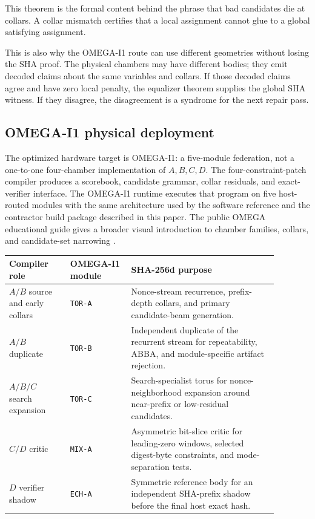\documentclass[11pt]{article}
\theoremstyle{definition}
\theoremstyle{remark}
\begin{document}
This theorem is the formal content behind the phrase that bad candidates die at
collars. A collar mismatch certifies that a local assignment cannot glue to a
global satisfying assignment.

This is also why the OMEGA-I1 route can use different geometries without losing
the SHA proof. The physical chambers may have different bodies; they emit
decoded claims about the same variables and collars. If those decoded claims
agree and have zero local penalty, the equalizer theorem supplies the global SHA
witness. If they disagree, the disagreement is a syndrome for the next repair
pass.

\subsection{OMEGA-I1 physical deployment}

The optimized hardware target is OMEGA-I1: a five-module federation, not
a one-to-one four-chamber implementation of \(A,B,C,D\). The four-constraint-patch compiler
produces a scorebook, candidate grammar, collar residuals, and exact-verifier
interface. The OMEGA-I1 runtime executes that program on five host-routed
modules with the
same architecture used by the software reference and the contractor build package
described in this paper.
The public OMEGA educational guide gives a broader visual introduction to
chamber families, collars, and candidate-set narrowing \cite{OmegaEducationalGuide2026}.

\begin{center}
\begin{minipage}{\linewidth}
\centering
\small
\begin{tabular}{L{0.20\linewidth}L{0.20\linewidth}L{0.48\linewidth}}
\toprule
Compiler role & OMEGA-I1 module & SHA-256d purpose\\
\midrule
\(A/B\) source and early collars & \texttt{TOR-A} &
Nonce-stream recurrence, prefix-depth collars, and primary candidate-beam
generation.\\
\(A/B\) duplicate & \texttt{TOR-B} &
Independent duplicate of the recurrent stream for repeatability, ABBA, and
module-specific artifact rejection.\\
\(A/B/C\) search expansion & \texttt{TOR-C} &
Search-specialist torus for nonce-neighborhood expansion around near-prefix
or low-residual candidates.\\
\(C/D\) critic & \texttt{MIX-A} &
Asymmetric bit-slice critic for leading-zero windows, selected digest-byte
constraints, and mode-separation tests.\\
\(D\) verifier shadow & \texttt{ECH-A} &
Symmetric reference body for an independent SHA-prefix shadow before the final
host exact hash.\\
\bottomrule
\end{tabular}
\label{tab:omega-i1-route}
\end{minipage}
\end{center}
\end{document}
